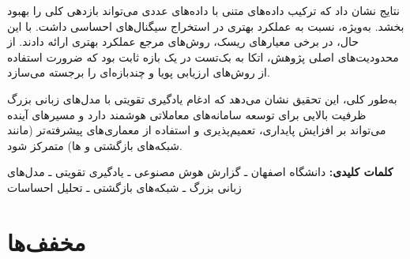\documentclass[12pt, a4paper]{report}
\begin{document}
نتایج نشان داد که ترکیب داده‌های متنی با داده‌های عددی می‌تواند بازدهی کلی را بهبود بخشد.  
به‌ویژه،  نسبت به  عملکرد بهتری در استخراج سیگنال‌های احساسی داشت.  
با این حال، در برخی معیارهای ریسک، روش‌های مرجع عملکرد بهتری ارائه دادند.  
از محدودیت‌های اصلی پژوهش، اتکا به بک‌تست در یک بازه ثابت بود که ضرورت استفاده از روش‌های ارزیابی پویا و چندبازه‌ای را برجسته می‌سازد.  

به‌طور کلی، این تحقیق نشان می‌دهد که ادغام یادگیری تقویتی با مدل‌های زبانی بزرگ ظرفیت بالایی برای توسعه سامانه‌های معاملاتی هوشمند دارد و مسیرهای آینده می‌تواند بر افزایش پایداری، تعمیم‌پذیری و استفاده از معماری‌های پیشرفته‌تر (مانند شبکه‌های بازگشتی و ها) متمرکز شود.  

\vspace{1em}
\noindent\textbf{کلمات کلیدی:} دانشگاه اصفهان ـ گزارش هوش مصنوعی ـ یادگیری تقویتی ـ مدل‌های زبانی بزرگ ـ شبکه‌های بازگشتی ـ تحلیل احساسات

\tableofcontents
\listoffigures
\listoftables

\newpage


\section*{مخفف‌ها}
\end{document}
